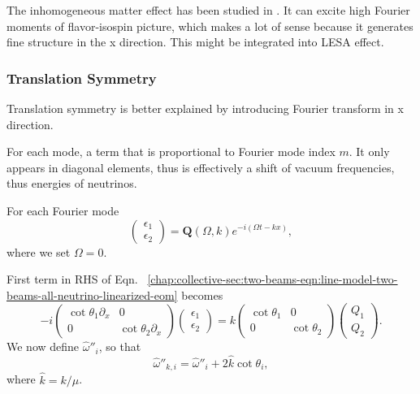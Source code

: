 The inhomogeneous matter effect has been studied in \cite{Mangano2014}. It can excite high Fourier moments of flavor-isospin picture, which makes a lot of sense because it generates fine structure in the x direction. This might be integrated into LESA effect.



\subsubsection{Translation Symmetry}


Translation symmetry is better explained by introducing Fourier transform in x direction.

For each mode, a term that is proportional to Fourier mode index $m$. It only appears in diagonal elements, thus is effectively a shift of vacuum frequencies, thus energies of neutrinos.

For each Fourier mode
\begin{equation*}
   \begin{pmatrix}
   \epsilon_1 \\
   \epsilon_2
   \end{pmatrix} =  \mathbf Q(\Omega,k) e^{-i(\Omega t- k x)},
\end{equation*}
where we set $\Omega=0$.

First term in RHS of Eqn.~ \ref{chap:collective-sec:two-beams-eqn:line-model-two-beams-all-neutrino-linearized-eom} becomes
\begin{equation*}
   - i \begin{pmatrix}\cot\theta_1\partial_x & 0 \\
   0 & \cot\theta_2 \partial_x
   \end{pmatrix} \begin{pmatrix}
   \epsilon_1 \\
   \epsilon_2
   \end{pmatrix} = k \begin{pmatrix}\cot\theta_1 & 0 \\
   0 & \cot\theta_2
   \end{pmatrix} \begin{pmatrix}
   Q_1 \\
   Q_2
   \end{pmatrix}.
\end{equation*}
We now define $\hat\omega''_i$, so that
\begin{equation*}
   \hat\omega''_{k,i} = \hat \omega''_i + 2\hat k\cot\theta_i,
\end{equation*}
where $\hat k=k/\mu$.

